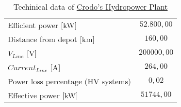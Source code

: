 \begin{table}[h]
\centering
\begin{tabular}{|lc|}
\hline
\rowcolor{bluepoli!40}\multicolumn{2}{|l|}{\textbf{Hydropower Plant Crodo}}                             \\ \hline
\multicolumn{1}{|l|}{Efficient   power {[}kW{]}}                    & $52.800,00$ \\ \hline
\multicolumn{1}{|l|}{Distance from depot {[}km{]}}                  & $160,00$    \\ \hline
\multicolumn{1}{|l|}{$V_{Line}$ {[}V{]}}                            & $200000,00$ \\ \hline
\multicolumn{1}{|l|}{$Current_{Line}$ {[}A{]}}                      & $264,00$    \\ \hline
\multicolumn{1}{|l|}{Power loss percentage (HV   systems)}          & $0,02$      \\ \hline
\multicolumn{1}{|l|}{Effective power {[}kW{]}}                      & $51744,00$  \\ \hline
\end{tabular}
\caption{Techinical data of \href{https://goo.gl/maps/dqKiAsYcyXrGMbUd6}{Crodo's Hydropower Plant} }
\label{tab:crodotechspec}
\end{table}